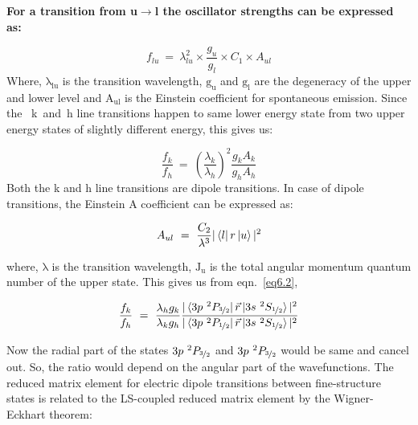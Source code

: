

{\bf For a transition from u$\rightarrow$l the oscillator strengths can be expressed as:

\begin{equation*}
    f_{lu}~=~\lambda_{lu}^{2}\times \frac{g_{u}}{g_{l}}\times C_{1}\times A_{ul}
\end{equation*}
Where, $\mathrm{\lambda_{lu}}$ is the transition wavelength, $\mathrm{g_{u}}$ and $\mathrm{g_{l}}$ are the degeneracy of the upper and lower level and $\mathrm{A_{ul}}$ is the Einstein coefficient for spontaneous emission. Since the ~k~and~h line transitions happen to same lower energy state from two upper energy states of slightly different energy, this gives us:

\begin{equation}\label{eq6.2}
    \frac{f_{k}}{f_{h}}~=~\left(\frac{\lambda_{k}}{\lambda_{h}}\right)^{2}\frac{g_{k}A_{k}}{g_{h}A_{h}}
\end{equation}
Both the k and h line transitions are dipole transitions. In case of dipole transitions, the Einstein A coefficient can be expressed as:

\begin{equation}
    A_{ul}~=~\frac{C_{2}}{\lambda^{3}}|\bra{l}r\ket{u}|^{2}
\end{equation}

\noindent where, $\mathrm{\lambda}$ is the transition wavelength, $\mathrm{J_u}$ is the total angular momentum quantum number of the upper state. This gives us from eqn.~\ref{eq6.2},

\begin{equation}\label{eqn6.4}
    \frac{f_k}{f_h}~=~\frac{\lambda_{h}g_k}{\lambda_{k}g_h}\frac{|\bra{3p~^{2}P_{\nicefrac{3}{2}}}\vec{r}\ket{3s~^{2}S_{\nicefrac{1}{2}}}|^{2}}{|\bra{3p~^{2}P_{\nicefrac{1}{2}}}\vec{r}\ket{3s~^{2}S_{\nicefrac{1}{2}}}|^{2}}
\end{equation}

Now the radial part of the states $3p~^{2}P_{\nicefrac{3}{2}}$ and $3p~^{2}P_{\nicefrac{3}{2}}$ would be same and cancel out. So, the ratio would depend on the angular part of the wavefunctions. The reduced matrix element for electric dipole transitions between fine-structure states is related to the LS-coupled reduced matrix element by the Wigner-Eckhart theorem:

}
